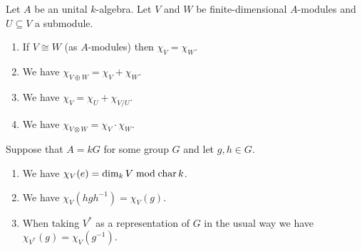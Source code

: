 \begin{prop}
 Let $A$ be an unital $k$-algebra. Let $V$ and $W$ be finite-dimensional $A$-modules and $U \subseteq V$ a submodule.
 \begin{enumerate}[label=\emph{\alph*})]
  \item
   If $V \cong W$ (as $A$-modules) then $\chi_V = \chi_W$.
  \item
   We have $\chi_{V \oplus W} = \chi_V + \chi_W$.
  \item
   We have $\chi_V = \chi_U + \chi_{V/U}$.
  \item
   We have $\chi_{V \otimes W} = \chi_V \cdot \chi_W$.
 \end{enumerate}
 Suppose that $A = kG$ for some group $G$ and let $g,h \in G$.
 \begin{enumerate}[label=\emph{\alph*}),resume]
  \item
   We have $\chi_V(e) = \dim_k V \bmod \operatorname{char} k$.
  \item
   We have $\chi_V(hgh^{-1}) = \chi_V(g)$.
  \item
   When taking $V^*$ as a representation of $G$ in the usual way we have $\chi_{V^*}(g) = \chi_V(g^{-1})$.
 \end{enumerate}
\end{prop}
